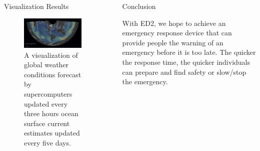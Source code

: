 \documentclass[final]{beamer}
\newlength{\sepwid}
\newlength{\onecolwid}
\newlength{\twocolwid}
\begin{document}
\begin{frame}[t]
\begin{columns}[t]
\begin{column}{\twocolwid}
\begin{columns}[t,totalwidth=\twocolwid]
\begin{column}{\onecolwid}
\begin{block}{Visualization Results}
\begin{figure}
\includegraphics[width=0.8\linewidth]{Flood_Levels.png}
\caption{A visualization of global weather conditions
forecast by supercomputers
updated every three hours ocean surface current estimates
updated every five days.}
\end{figure}



\end{block}


\end{column} %

\end{columns} %

\end{column} %

\begin{column}{\sepwid}\end{column} %

\begin{column}{\onecolwid} %


\begin{block}{Conclusion}

With ED2, we hope to achieve an emergency response device that can provide people the warning of an emergency before it is too late. The quicker the response time, the quicker individuals can prepare and find safety or slow/stop the emergency.   

\end{block}



\end{column}
\end{columns}
\end{frame}
\end{document}
